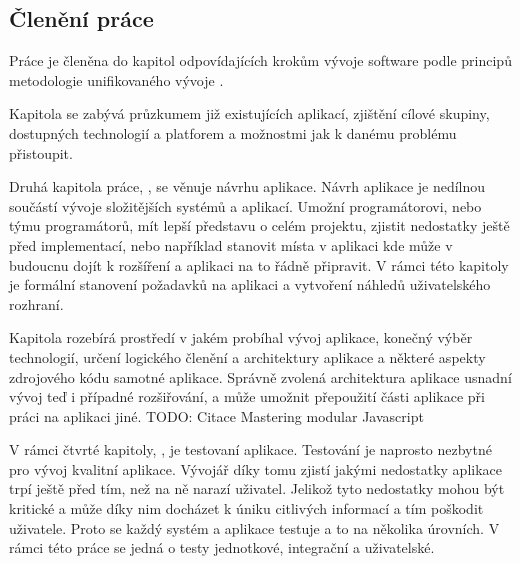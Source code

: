 \begin{introduction}
    \section{Členění práce}
    Práce je členěna do kapitol odpovídajících krokům vývoje software podle principů metodologie unifikovaného vývoje \cite[s.~51-68]{arlow_2007_uml}.

    Kapitola  se zabývá průzkumem již existujících aplikací, zjištění cílové skupiny, dostupných technologií a platforem a možnostmi jak k danému problému přistoupit.

    Druhá kapitola práce, , se věnuje návrhu aplikace. Návrh aplikace je nedílnou součástí vývoje složitějších systémů a aplikací. Umožní programátorovi, nebo týmu programátorů, mít lepší představu o celém projektu, zjistit nedostatky ještě před implementací, nebo například stanovit místa v aplikaci kde může v budoucnu dojít k rozšíření a aplikaci na to řádně připravit. V rámci této kapitoly je formální stanovení požadavků na aplikaci a vytvoření náhledů uživatelského rozhraní.

    Kapitola  rozebírá prostředí v jakém probíhal vývoj aplikace, konečný výběr technologií, určení logického členění a architektury aplikace a některé aspekty zdrojového kódu samotné aplikace. Správně zvolená architektura aplikace usnadní vývoj teď i případné rozšiřování, a může umožnit přepoužití části aplikace při práci na aplikaci jiné. TODO: Citace Mastering modular Javascript

    V rámci čtvrté kapitoly, , je testovaní aplikace. Testování je naprosto nezbytné pro vývoj kvalitní aplikace. Vývojář díky tomu zjistí jakými nedostatky aplikace trpí ještě před tím, než na ně narazí uživatel. Jelikož tyto nedostatky mohou být kritické a může díky nim docházet k úniku citlivých informací a tím poškodit uživatele. Proto se každý systém a aplikace testuje a to na několika úrovních. V rámci této práce se jedná o testy jednotkové, integrační a uživatelské.
\end{introduction}